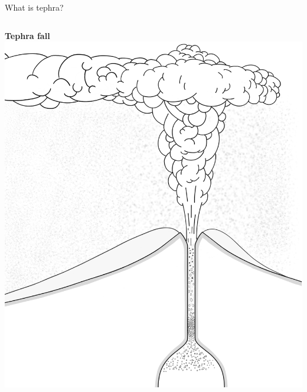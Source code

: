 \documentclass[10pt,aspectratio=169]{beamer}
\begin{document}
\begin{frame}{What is tephra?}
{\begin{columns}[T]
      \begin{column}{0.5\textwidth}	
        \textbf{Tephra fall} \\ \vspace*{1em}
        \centering \includegraphics[width=.85\textwidth]{img/tephra_fall.png}
      \end{column}
    \end{columns}
  }
\end{frame}
\end{document}
